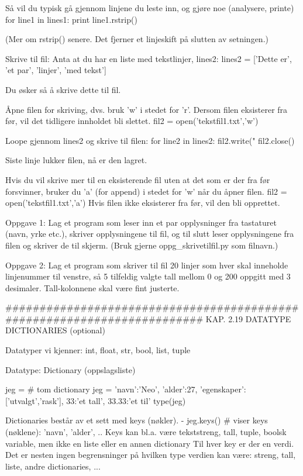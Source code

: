 Så vil du typisk gå gjennom linjene du leste inn, og gjøre noe (analysere, printe)
for line1 in lines1:
    print line1.rstrip()          

(Mer om rstrip() senere. Det fjerner et linjeskift på slutten av setningen.)


Skrive til fil: 
Anta at du har en liste med tekstlinjer, lines2: 
lines2 = ['Dette er', 'et par', 'linjer', 'med tekst']

Du øsker så å skrive dette til fil.

Åpne filen for skriving, dvs. bruk 'w' i stedet for 'r'. 
Dersom filen eksisterer fra før, vil det tidligere innholdet bli slettet.
fil2 = open('tekstfil1.txt','w')    

Loope gjennom lines2 og skrive til filen:
for line2 in lines2:
    fil2.write("%
fil2.close()                        

Siste linje lukker filen, nå er den lagret. 

Hvis du vil skrive mer til en eksisterende fil uten at det som er der fra før forsvinner,
bruker du 'a' (for append) i stedet for 'w' når du åpner filen.
fil2 = open('tekstfil1.txt','a')
Hvis filen ikke eksisterer fra før, vil den bli opprettet. 

 

Oppgave 1: Lag et program som leser inn et par opplysninger fra tastaturet 
(navn, yrke etc.), skriver opplysningene til fil, og til slutt leser 
opplysningene fra filen og skriver de til skjerm.
(Bruk gjerne oppg_skrivetilfil.py som filnavn.)


Oppgave 2: Lag et program som skriver til fil 20 linjer som hver skal inneholde linjenummer til venstre,
så 5 tilfeldig valgte tall mellom 0 og 200 oppgitt med 3 desimaler.
Tall-kolonnene skal være fint justerte. 

######################################################################## 
KAP. 2.19  DATATYPE DICTIONARIES  (optional)

Datatyper vi kjenner: int, float, str, bool, list, tuple 

Datatype: Dictionary (oppslagsliste)

jeg = {}  # tom dictionary
jeg = {'navn':'Neo', 'alder':27, 'egenskaper':['utvalgt','rask'], 33:'et tall', 33.33:'et til'} 
type(jeg) 

Dictionaries består av et sett med keys (nøkler). 
- jeg.keys()  # viser keys (nøklene): 'navn', 'alder', ..
Keys kan bl.a. være tekststreng, tall, tuple, boolsk variable, 
men ikke en liste eller en annen dictionary 
Til hver key er der en verdi. 
Det er nesten ingen begrensninger på hvilken type verdien kan være: 
streng, tall, liste, andre dictionaries, ...

